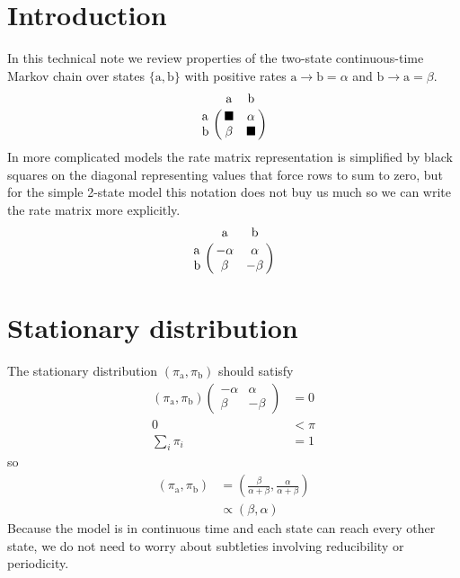 \documentclass{article}
\providecommand{\Ao}{\text{a}}
\providecommand{\Bo}{\text{b}}
\providecommand{\Pa}{\alpha}
\providecommand{\Pb}{\beta}
\providecommand{\bs}{\blacksquare}
\begin{document}

\section{Introduction}

In this technical note we review properties of the two-state continuous-time
Markov chain over states $\{ \Ao, \Bo \}$ with positive rates
$\Ao \to \Bo = \Pa$ and $\Bo \to \Ao = \Pb$.
%
\begin{equation}
\bordermatrix{
	    & \Ao  & \Bo  \cr
	\Ao & \bs  & \Pa \cr
	\Bo & \Pb & \bs  \cr
}
\end{equation}
%
In more complicated models the rate matrix representation is simplified
by black squares on the diagonal representing values that force
rows to sum to zero, but for the simple 2-state model this notation
does not buy us much so we can write the rate matrix more explicitly.
%
\begin{equation}
\bordermatrix{
	    & \Ao  & \Bo  \cr
	\Ao & -\Pa  & \Pa \cr
	\Bo & \Pb & -\Pb  \cr
}
\end{equation}

\section{Stationary distribution}

The stationary distribution
$\left( \pi_\Ao, \pi_\Bo \right)$
should satisfy
\begin{align}
\left( \pi_\Ao, \pi_\Bo \right)
\begin{pmatrix}
	-\Pa & \Pa \\
	\Pb & -\Pb
\end{pmatrix}
&= 0 \\
0 &< \pi \\
\sum_i \pi_i &= 1
\end{align}
%
so
\begin{align}
\left( \pi_\Ao, \pi_\Bo \right)
&=
\left( \frac{\Pb}{\Pa + \Pb}, \frac{\Pa}{\Pa + \Pb} \right) \\
&\propto
\left( \Pb, \Pa \right)
\end{align}
%
Because the model is in continuous time
and each state can reach every other state,
we do not need to worry about subtleties involving reducibility or periodicity.
\end{document}
